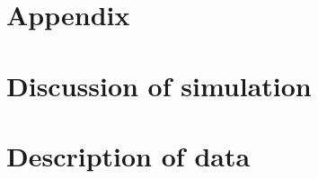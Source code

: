 \documentclass[12pt,a4paper]{article}
\begin{document}

\renewcommand\theequation{\Alph{section}\arabic{equation}} %
\renewcommand\thefigure{\Alph{section}\arabic{figure}} %
\renewcommand\thetable{\Alph{section}\arabic{table}} %


\begin{appendices}

\section*{Appendix}
\section{Discussion of simulation}
\section{Description of data}




\end{appendices}
\end{document}
